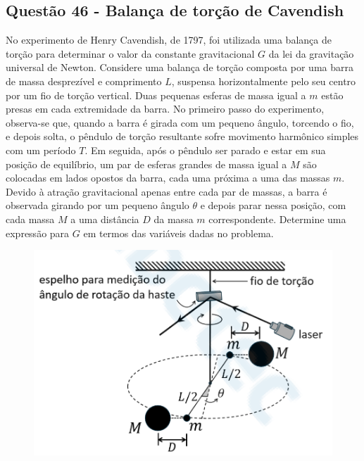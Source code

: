 \documentclass[a4paper,12pt]{article}
\begin{document}
\begin{flushleft}
\subsection{Quest\~ao 46 - Balan\c{c}a de tor\c{c}\~ao de Cavendish}

No experimento de Henry Cavendish, de 1797, foi utilizada uma balan\c{c}a de tor\c{c}\~ao
para determinar o valor da constante gravitacional $G$ da lei da gravita\c{c}\~ao universal de Newton.
Considere uma balan\c{c}a de tor\c{c}\~ao composta por uma barra de massa desprez\'ivel e comprimento $L$,
suspensa horizontalmente pelo seu centro por um fio de tor\c{c}\~ao vertical. Duas pequenas esferas de
massa igual a $m$ est\~ao presas em cada extremidade da barra. No primeiro passo do experimento,
observa-se que, quando a barra \'e girada com um pequeno \^angulo, torcendo o fio, e depois solta, o
p\^endulo de tor\c{c}\~ao resultante sofre movimento harm\^onico simples com um per\'iodo $T$. Em seguida,
ap\'os o p\^endulo ser parado e estar em sua posi\c{c}\~ao de equil\'ibrio, um par de esferas grandes de massa
igual a $M$ s\~ao colocadas em lados opostos da barra, cada uma pr\'oxima a uma das massas $m$. Devido
\`a atra\c{c}\~ao gravitacional apenas entre cada par de massas, a barra \'e observada girando por um pequeno
\^angulo $\theta$ e depois parar nessa posi\c{c}\~ao, com cada massa $M$ a uma dist\^ancia $D$ da massa $m$
correspondente. Determine uma express\~ao para $G$ em termos das vari\'aveis dadas no problema.

\begin{figure}[!h]
  \centering
  \includegraphics[scale=0.3]{figures/henry_cavendish.png}
\end{figure}


\end{flushleft}
\end{document}
